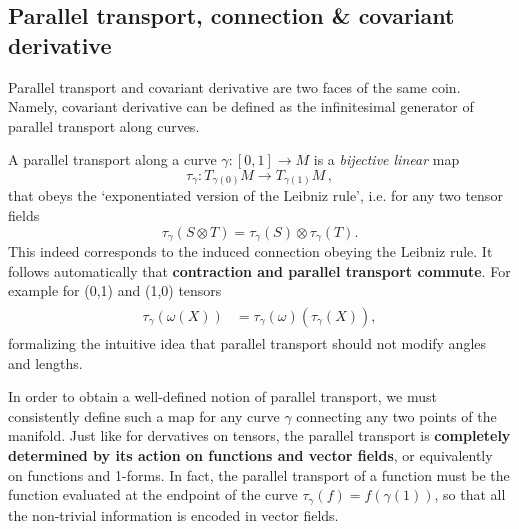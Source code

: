 \documentclass[../geometry_main.tex]{subfiles}
\begin{document}
\subsection{Parallel transport, connection \& covariant derivative}


Parallel transport and covariant derivative are two faces of the same coin.
Namely, covariant derivative can be defined as the infinitesimal generator of parallel transport along curves.

\begin{mytheorem}
A parallel transport along a curve $\gamma: [0,1] \to M$ is a \emph{bijective linear} map 
\begin{equation}
    \tau_{\gamma}: T_{\gamma(0)} M \to T_{\gamma(1)} M\,,
\end{equation}
that obeys the `exponentiated version of the Leibniz rule', i.e. for any two tensor fields
\begin{equation}\label{}
    \tau_{\gamma} (S \otimes T) = \tau_{\gamma} (S) \otimes \tau_{\gamma} (T).
\end{equation}
This indeed corresponds to the induced connection obeying the Leibniz rule.
It follows automatically that \textbf{contraction and parallel transport commute}.
For example for (0,1) and (1,0) tensors
\begin{align}\begin{aligned}
    \tau_{\gamma} (\omega(X)) &= \tau_{\gamma} (\omega) (\tau_{\gamma} (X)),
\end{aligned}\end{align}
formalizing the intuitive idea that parallel transport should not modify angles and lengths.

In order to obtain a well-defined notion of parallel transport, we must consistently define such a map for any curve $\gamma$ connecting any two points of the manifold.
Just like for dervatives on tensors, the parallel transport is \textbf{completely determined by its action on functions and vector fields}, or equivalently on functions and 1-forms.
In fact, the parallel transport of a function must be the function evaluated at the endpoint of the curve $\tau_{\gamma} (f) = f(\gamma(1))$, so that all the non-trivial information is encoded in vector fields.
\end{mytheorem}
\end{document}
